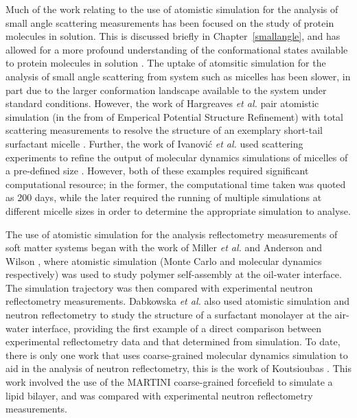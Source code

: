 Much of the work relating to the use of atomistic simulation for the analysis of small angle scattering measurements has been focused on the study of protein molecules in solution.
This is discussed briefly in Chapter~\ref{smallangle}, and has allowed for a more profound understanding of the conformational states available to protein molecules in solution \cite{bowerman_determining_2017}.
The uptake of atomsitic simulation for the analysis of small angle scattering from system such as micelles has been slower, in part due to the larger conformation landscape available to the system under standard conditions.
However, the work of Hargreaves \emph{et al.} pair atomistic simulation (in the from of Emperical Potential Structure Refinement) with total scattering measurements to resolve the structure of an exemplary short-tail surfactant micelle \cite{hargreaves_atomistic_2011}.
Further, the work of Ivanovi\'{c} \emph{et al.} used scattering experiments to refine the output of molecular dynamics simulations of micelles of a pre-defined size \cite{ivanovic_temperature-dependent_2018}.
However, both of these examples required significant computational resource; in the former, the computational time taken was quoted as 200 days, while the later required the running of multiple simulations at different micelle sizes in order to determine the appropriate simulation to analyse.

The use of atomistic simulation for the analysis reflectometry measurements of soft matter systems began with the work of Miller \emph{et al.} and Anderson and Wilson \cite{miller_monte_2003,anderson_molecular_2004}, where atomistic simulation (Monte Carlo and molecular dynamics respectively) was used to study polymer self-assembly at the oil-water interface.
The simulation trajectory was then compared with experimental neutron reflectometry measurements.
Dabkowska \emph{et al.} also used atomistic simulation and neutron reflectometry to study the structure of a surfactant monolayer at the air-water interface, providing the first example of a direct comparison between experimental reflectometry data and that determined from simulation.
To date, there is only one work that uses coarse-grained molecular dynamics simulation to aid in the analysis of neutron reflectometry, this is the work of Koutsioubas \cite{koutsioubas_combined_2016}.
This work involved the use of the MARTINI coarse-grained forcefield to simulate a lipid bilayer, and was compared with experimental neutron reflectometry measurements.
